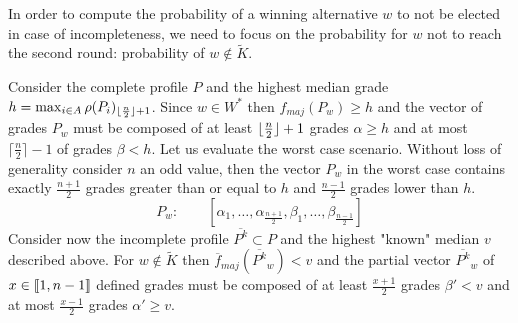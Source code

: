 \documentclass[version=3.21, pagesize, twoside=off, bibliography=totoc, DIV=calc, fontsize=12pt, a4paper]{scrartcl}
\begin{document}
In order to compute the probability of a winning alternative $w$ to not be elected in case of incompleteness, we need to focus on the probability for $w$ not to reach the second round: probability of $w \notin \tilde{K}$.

Consider the complete profile $P$ and the highest median grade $h=\max_{i\in A}\rho(P_i)_{\lfloor\frac{n}{2}\rfloor + 1}$. Since $w \in W^*$ then $f_{maj}(P_{w})\geq h$ and the vector of grades $P_w$ must be composed of at least $\lfloor\frac{n}{2}\rfloor+1$ grades $\alpha \geq h$ and at most $\lceil \frac{n}{2}\rceil-1$ of grades $\beta < h$. Let us evaluate the worst case scenario.
Without loss of generality consider $n$ an odd value, then the vector $P_{w}$ in the worst case contains exactly $\frac{n+1}{2}$ grades greater than or equal to $h$ and $\frac{n-1}{2}$ grades lower than $h$.
\[P_w : \qquad [ \alpha_1, \dots , \alpha_{\frac{n+1}{2}}, \beta_1, \dots , \beta_{\frac{n-1}{2}} ] \]
Consider now the incomplete profile $\overline{P^k} \subset P$ and the highest "known" median $v$ described above. For $w \notin \tilde{K}$ then $\overline{f}_{maj}(\overline{P^k}_w) < v$ and the partial vector $\overline{P^k}_w$ of $x\in \llbracket1,n-1\rrbracket$ defined grades must be composed of at least $\frac{x+1}{2}$ grades $\beta'<v$ and at most $\frac{x-1}{2}$ grades $\alpha' \geq v$. 
\end{document}
